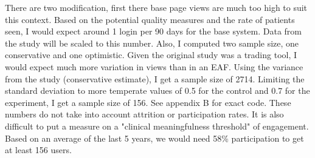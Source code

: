 There are two modification, first there base page views are much too high to suit this context. Based on the potential quality measures and the rate of patients seen, I would expect around 1 login per 90 days for the base system. Data from the study will be scaled to this number. Also, I computed two sample size, one conservative and one optimistic. Given the original study was a trading tool, I would expect much more variation in views than in an \gls{EAF}. Using the variance from the study (conservative estimate), I get a sample size of 2714. Limiting the standard deviation to more temperate values of 0.5 for the control and 0.7 for the experiment, I get a sample size of 156. See appendix B for exact code. These numbers do not take into account attrition or participation rates. It is also difficult to put a measure on a "clinical meaningfulness threshold" of engagement. Based on an average of the last 5 years, we would need 58\% participation to get at least 156 users.

%

